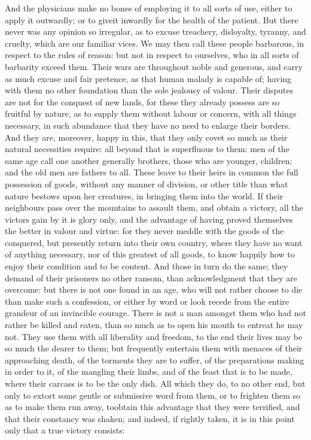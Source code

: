 \documentclass[twocolumn]{article}
\newcommand{\specialbreaks}[1]{\linebreak\newpage\noindent\setline{#1}}
\begin{document}
	And the physicians make no bones of employing it to all sorts of use, either to apply it outwardly; or to give\specialbreaks{398}it inwardly for the health of the patient. But there never was any opinion so irregular, as to excuse treachery, disloyalty, tyranny, and cruelty, which are our familiar vices. We may then call these people barbarous, in respect to the rules of reason: but not in respect to ourselves, who in all sorts of barbarity exceed them. Their wars are throughout noble and generous, and carry as much excuse and fair pretence, as that human malady is capable of; having with them no other foundation than the sole jealousy of valour. Their disputes are not for the conquest of new lands, for these they already possess are so fruitful by nature, as to supply them without labour or concern, with all things necessary, in such abundance that they have no need to enlarge their borders. And they are, moreover, happy in this, that they only covet so much as their natural necessities require: all beyond that is superfluous to them: men of the same age call one another generally brothers, those who are younger, children; and the old men are fathers to all. These leave to their heirs in common the full possession of goods, without any manner of division, or other title than what nature bestows upon her creatures, in bringing them into the world. If their neighbours pass over the mountains to assault them, and obtain a victory, all the victors gain by it is glory only, and the advantage of having proved themselves the better in valour and virtue: for they never meddle with the goods of the conquered, but presently return into their own country, where they have no want of anything necessary, nor of this greatest of all goods, to know happily how to enjoy their condition and to be content. And those in turn do the same; they demand of their prisoners no other ransom, than acknowledgment that they are overcome: but there is not one found in an age, who will not rather choose to die than make such a confession, or either by word or look recede from the entire grandeur of an invincible courage. There is not a man amongst them who had not rather be killed and eaten, than so much as to open his mouth to entreat he may not. They use them with all liberality and freedom, to the end their lives may be so much the dearer to them; but frequently entertain them with menaces of their approaching death, of the torments they are to suffer, of the preparations making in order to it, of the mangling their limbs, and of the feast that is to be made, where their carcass is to be the only dish. All which they do, to no other end, but only to extort some gentle or submissive word from them, or to frighten them so as to make them run away, to\specialbreaks{447}obtain this advantage that they were terrified, and that their constancy was shaken; and indeed, if rightly taken, it is in this point only that a true victory consists:
\end{document}
